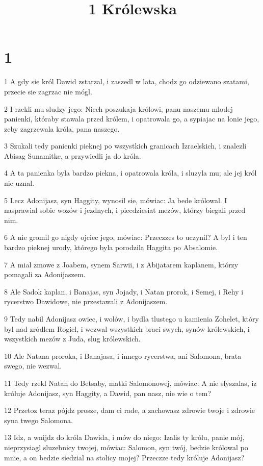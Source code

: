 

\title{1 Królewska}


\chapter{1}

\par 1 A gdy sie król Dawid zstarzal, i zaszedl w lata, chodz go odziewano szatami, przecie sie zagrzac nie mógl.
\par 2 I rzekli mu sludzy jego: Niech poszukaja królowi, panu naszemu mlodej panienki, któraby stawala przed królem, i opatrowala go, a sypiajac na lonie jego, zeby zagrzewala króla, pana naszego.
\par 3 Szukali tedy panienki pieknej po wszystkich granicach Izraelskich, i znalezli Abisag Sunamitke, a przywiedli ja do króla.
\par 4 A ta panienka byla bardzo piekna, i opatrowala króla, i sluzyla mu; ale jej król nie uznal.
\par 5 Lecz Adonijasz, syn Haggity, wynosil sie, mówiac: Ja bede królowal. I nasprawial sobie wozów i jezdnych, i piecdziesiat mezów, którzy biegali przed nim.
\par 6 A nie gromil go nigdy ojciec jego, mówiac: Przeczzes to uczynil? A byl i ten bardzo pieknej urody, którego byla porodzila Haggita po Absalomie.
\par 7 A mial zmowe z Joabem, synem Sarwii, i z Abijatarem kaplanem, którzy pomagali za Adonijaszem.
\par 8 Ale Sadok kaplan, i Banajas, syn Jojady, i Natan prorok, i Semej, i Rehy i rycerstwo Dawidowe, nie przestawali z Adonijaszem.
\par 9 Tedy nabil Adonijasz owiec, i wolów, i bydla tlustego u kamienia Zohelet, który byl nad zródlem Rogiel, i wezwal wszystkich braci swych, synów królewskich, i wszystkich mezów z Juda, slug królewskich.
\par 10 Ale Natana proroka, i Banajasa, i innego rycerstwa, ani Salomona, brata swego, nie wezwal.
\par 11 Tedy rzekl Natan do Betsaby, matki Salomonowej, mówiac: A nie slyszalas, iz króluje Adonijasz, syn Haggity, a Dawid, pan nasz, nie wie o tem?
\par 12 Przetoz teraz pójdz prosze, dam ci rade, a zachowasz zdrowie twoje i zdrowie syna twego Salomona.
\par 13 Idz, a wnijdz do króla Dawida, i mów do niego: Izalis ty królu, panie mój, nieprzysiagl sluzebnicy twojej, mówiac: Salomon, syn twój, bedzie królowal po mnie, a on bedzie siedzial na stolicy mojej? Przeczze tedy króluje Adonijasz?
